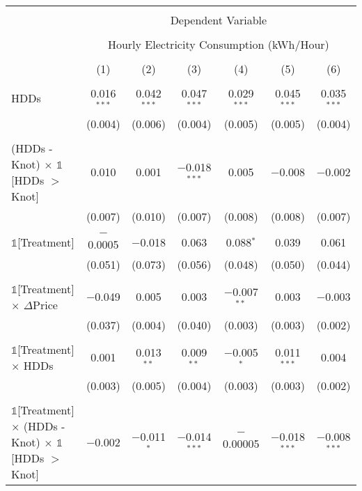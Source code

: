 
\begin{table}[!htbp] \centering 
  \label{Table:Breakdown-of-Average-Treatement-Effects_As-a-Function-of-Rate-Changes_For-Different-Intervals} 
\scriptsize
\begin{longtable}{@{\extracolsep{15pt}}lcccccc} 
\\[-1.8ex]\hline 
\hline \\[-1.8ex] 
 & \multicolumn{6}{c}{Dependent Variable} \\ 
\cline{2-7} 
\\[-1.8ex] & \multicolumn{6}{c}{Hourly Electricity Consumption  (kWh/Hour)} \\ 
\\[-1.8ex] & (1) & (2) & (3) & (4) & (5) & (6)\\ 
\hline \\[-1.8ex] \endhead
 HDDs & 0.016$^{***}$ & 0.042$^{***}$ & 0.047$^{***}$ & 0.029$^{***}$ & 0.045$^{***}$ & 0.035$^{***}$ \\ 
  & (0.004) & (0.006) & (0.004) & (0.005) & (0.005) & (0.004) \\ 
  & & & & & & \\ 
 (HDDs - Knot) $\times$ $\mathbb{1}$[HDDs $>$ Knot] & 0.010 & 0.001 & $-$0.018$^{***}$ & 0.005 & $-$0.008 & $-$0.002 \\ 
  & (0.007) & (0.010) & (0.007) & (0.008) & (0.008) & (0.007) \\ 
  & & & & & & \\ 
 $\mathbb{1}$[Treatment] & $-$0.0005 & $-$0.018 & 0.063 & 0.088$^{*}$ & 0.039 & 0.061 \\ 
  & (0.051) & (0.073) & (0.056) & (0.048) & (0.050) & (0.044) \\ 
  & & & & & & \\ 
 $\mathbb{1}$[Treatment] $\times$ $\Delta$Price & $-$0.049 & 0.005 & 0.003 & $-$0.007$^{**}$ & 0.003 & $-$0.003 \\ 
  & (0.037) & (0.004) & (0.040) & (0.003) & (0.003) & (0.002) \\ 
  & & & & & & \\ 
 $\mathbb{1}$[Treatment] $\times$ HDDs & 0.001 & 0.013$^{**}$ & 0.009$^{**}$ & $-$0.005$^{*}$ & 0.011$^{***}$ & 0.004 \\ 
  & (0.003) & (0.005) & (0.004) & (0.003) & (0.003) & (0.002) \\ 
  & & & & & & \\ 
 $\mathbb{1}$[Treatment] $\times$ (HDDs - Knot) $\times$ $\mathbb{1}$[HDDs $>$ Knot] & $-$0.002 & $-$0.011$^{*}$ & $-$0.014$^{***}$ & $-$0.00005 & $-$0.018$^{***}$ & $-$0.008$^{***}$ \\ 

\end{longtable}
\end{table}
